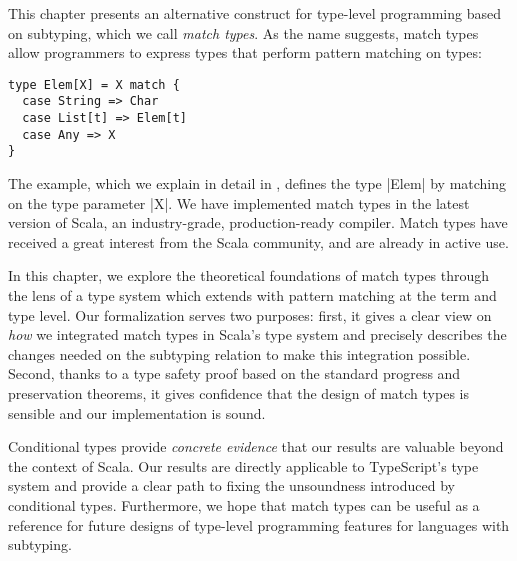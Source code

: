This chapter presents an alternative construct for type-level programming based on subtyping, which we call \emph{match types}.
As the name suggests, match types allow programmers to express types that perform pattern matching on types:
%
\begin{lstlisting}
type Elem[X] = X match {
  case String => Char
  case List[t] => Elem[t]
  case Any => X
}
\end{lstlisting}
%
The example, which we explain in detail in , defines the type |Elem| by matching on the type parameter |X|.
%
We have implemented match types in the latest version of Scala, an industry-grade, production-ready compiler.
Match types have received a great interest from the Scala community, and are already in active use.

In this chapter, we explore the theoretical foundations of match types through the lens of a type system which extends \SystemFsub with pattern matching at the term and type level.
%
Our formalization serves two purposes: first, it gives a clear view on \emph{how} we integrated match types in Scala's type system and precisely describes the changes needed on the subtyping relation to make this integration possible. Second, thanks to a type safety proof based on the standard progress and preservation theorems, it gives confidence that the design of match types is sensible and our implementation is sound.

Conditional types provide \emph{concrete evidence} that our results are valuable beyond the context of Scala.
Our results are directly applicable to TypeScript's type system and provide a clear path to fixing the unsoundness introduced by conditional types.
Furthermore, we hope that match types can be useful as a reference for future designs of type-level programming features for languages with subtyping.

